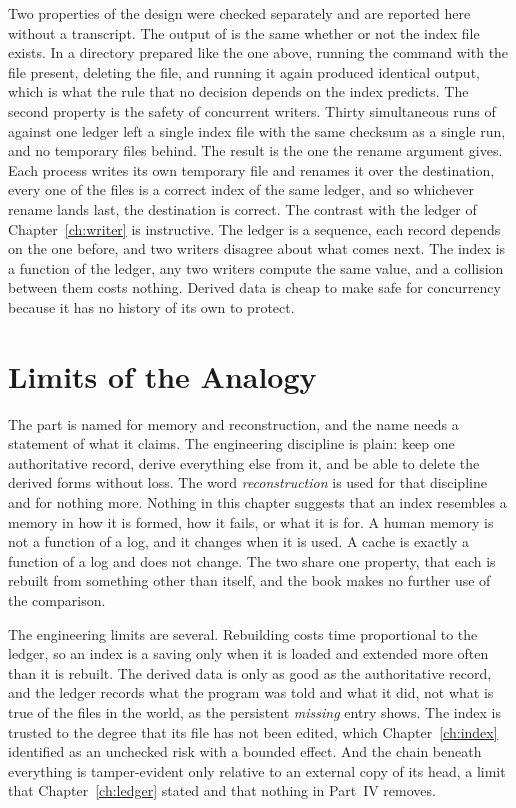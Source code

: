 Two properties of the design were checked separately and are reported here without a transcript. The output of  is the same whether or not the index file exists. In a directory prepared like the one above, running the command with the file present, deleting the file, and running it again produced identical output, which is what the rule that no decision depends on the index predicts. The second property is the safety of concurrent writers. Thirty simultaneous runs of  against one ledger left a single index file with the same checksum as a single run, and no temporary files behind. The result is the one the rename argument gives. Each process writes its own temporary file and renames it over the destination, every one of the files is a correct index of the same ledger, and so whichever rename lands last, the destination is correct. The contrast with the ledger of Chapter~\ref{ch:writer} is instructive. The ledger is a sequence, each record depends on the one before, and two writers disagree about what comes next. The index is a function of the ledger, any two writers compute the same value, and a collision between them costs nothing. Derived data is cheap to make safe for concurrency because it has no history of its own to protect.

\section{Limits of the Analogy}

The part is named for memory and reconstruction, and the name needs a statement of what it claims. The engineering discipline is plain: keep one authoritative record, derive everything else from it, and be able to delete the derived forms without loss. The word \emph{reconstruction} is used for that discipline and for nothing more. Nothing in this chapter suggests that an index resembles a memory in how it is formed, how it fails, or what it is for. A human memory is not a function of a log, and it changes when it is used. A cache is exactly a function of a log and does not change. The two share one property, that each is rebuilt from something other than itself, and the book makes no further use of the comparison.

The engineering limits are several. Rebuilding costs time proportional to the ledger, so an index is a saving only when it is loaded and extended more often than it is rebuilt. The derived data is only as good as the authoritative record, and the ledger records what the program was told and what it did, not what is true of the files in the world, as the persistent \emph{missing} entry shows. The index is trusted to the degree that its file has not been edited, which Chapter~\ref{ch:index} identified as an unchecked risk with a bounded effect. And the chain beneath everything is tamper-evident only relative to an external copy of its head, a limit that Chapter~\ref{ch:ledger} stated and that nothing in Part~IV removes.


